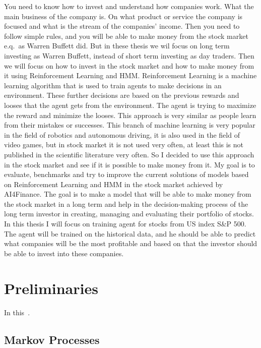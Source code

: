 You need to know how to invest and understand how companies work.
What the main business of the company is.
On what product or service the company is focused
and what is the stream of the companies' income.
Then you need
to follow simple rules, and you will be able to make money from the stock market e.q.\ as Warren Buffett did.
But in these thesis we wil focus on long term investing as Warren Buffett,
instead of short term investing as day traders.
Then we will focus on how to invest in the stock market and how to make money
from it using Reinforcement Learning and HMM\@.
Reinforcement Learning is a machine learning algorithm that is used to train agents to
make decisions in an environment.
These further decisions are based on the previous rewards and looses that the agent
gets from the environment.
The agent is trying to maximize the reward and minimize the looses.
This approach is very similar as people learn from their mistakes or successes.
This branch of machine learning is very popular in the field of robotics and autonomous driving,
it is also used in the field of video games, but in stock market it is not used very often,
at least this is not published in the scientific literature very often.
So I decided to use this approach in the stock market and see if it is possible to make money from it.
My goal is to evaluate, benchmarks and try to improve the current solutions of models
based on Reinforcement Learning and HMM in the stock market achieved by AI4Finance.
The goal is to make a model that will be able to make money from the stock market in a long term
and help in the decision-making process of the long term investor in creating, managing and evaluating
their portfolio of stocks.
In this thesis I will focus on training agent for stocks from US index S\&P 500.
The agent will be trained on the historical data, and he should be able to predict
what companies will be the most profitable and based on that the investor should be able
to invest into these companies.




\chapter{Preliminaries}\label{ch:preliminaries}
In this~\cite{biblio}.


\section{Markov Processes}\label{sec:markov-processes}


